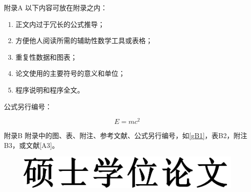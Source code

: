 \begin{Appendix}{附录A}\label{appA}
    以下内容可放在附录之内：

    \begin{enumerate}
        \item 正文内过于冗长的公式推导；
        \item 方便他人阅读所需的辅助性数学工具或表格；
        \item 重复性数据和图表；
        \item 论文使用的主要符号的意义和单位；
        \item 程序说明和程序全文。
    \end{enumerate}

    公式另行编号：

    \begin{equation}\label{eqA1}
        E=mc^2
    \end{equation}
\end{Appendix}

\begin{Appendix}{附录B}
    附录中的图、表、附注、参考文献、公式另行编号，如\ref{gB1}，表B2，附注B3，或文献[A3]。

    \begin{figure}[H]
        \centering
        \includegraphics*[width=0.7\linewidth]{Figure/master-hwzs.pdf}
    \end{figure}
\end{Appendix}